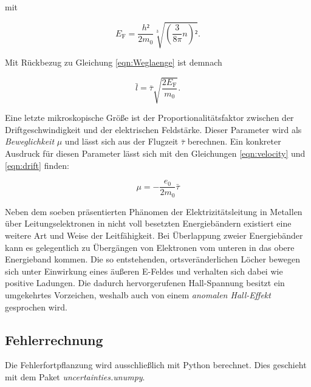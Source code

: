 \noindent mit 

\begin{equation*}
    E_\text{F} = \frac{h²}{2m_0}\sqrt[3]{\left(\frac{3}{8\pi}n\right)²}.
\end{equation*}

\noindent Mit Rückbezug zu Gleichung \eqref{eqn:Weglaenge} ist demnach 

\begin{equation}
    \label{eqn:mitlaenge}
    \bar{l} = \bar{\tau}\sqrt{\frac{2E_\text{F}}{m_0}}.
\end{equation}

\noindent Eine letzte mikroskopische Größe ist der Proportionalitätsfaktor zwischen der Driftgeschwindigkeit und der
elektrischen Feldstärke. Dieser Parameter wird als \emph{Beweglichkeit} $\mu$ und lässt sich aus der Flugzeit
$\bar{\tau}$ berechnen. Ein konkreter Ausdruck für diesen Parameter lässt sich mit den Gleichungen \eqref{eqn:velocity}
und \eqref{eqn:drift} finden:

\begin{equation}
\label{eqn:Beweglichkeit}
    \mu = -\frac{e_0}{2m_0}\bar{\tau}
\end{equation}

\noindent Neben dem soeben präsentierten Phänomen der Elektrizitätsleitung in Metallen
über Leitungselektronen in nicht voll besetzten Energiebändern existiert eine weitere Art und Weise der Leitfähigkeit.
Bei Überlappung zweier Energiebänder kann es gelegentlich zu Übergängen von Elektronen vom unteren in das 
obere Energieband kommen. Die so entstehenden, ortsveränderlichen Löcher bewegen sich unter Einwirkung eines äußeren 
E-Feldes und verhalten sich dabei wie positive Ladungen. Die dadurch hervorgerufenen Hall-Spannung besitzt ein 
umgekehrtes Vorzeichen, weshalb auch von einem \emph{anomalen Hall-Effekt} gesprochen wird. 



\subsection{Fehlerrechnung}
\noindent Die Fehlerfortpflanzung wird ausschließlich mit Python berechnet. 
Dies geschieht mit dem Paket \emph{uncertainties.unumpy}.

%